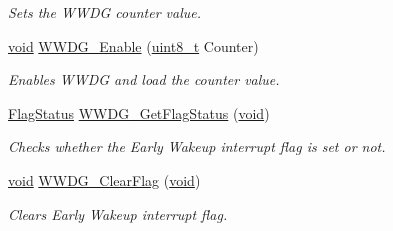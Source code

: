 \begin{DoxyCompactItemize}
\begin{DoxyCompactList}\small\item\em Sets the W\+W\+DG counter value. \end{DoxyCompactList}\item 
\hyperlink{usb__devapi_8h_afabf60e7f57651d6d595a02c75f07cd0}{void} \hyperlink{group___w_w_d_g___private___functions_ga10dc2554d0b504b5472e3ecf0f02a9e6}{W\+W\+D\+G\+\_\+\+Enable} (\hyperlink{_p_e___types_8h_aba7bc1797add20fe3efdf37ced1182c5}{uint8\+\_\+t} Counter)
\begin{DoxyCompactList}\small\item\em Enables W\+W\+DG and load the counter value. \end{DoxyCompactList}\item 
\hyperlink{agilefox_2library_2inc_2stm32f10x__type_8h_a89136caac2e14c55151f527ac02daaff}{Flag\+Status} \hyperlink{group___w_w_d_g___private___functions_ga7df4882d45918b9b8249dfca1e44fabc}{W\+W\+D\+G\+\_\+\+Get\+Flag\+Status} (\hyperlink{usb__devapi_8h_afabf60e7f57651d6d595a02c75f07cd0}{void})
\begin{DoxyCompactList}\small\item\em Checks whether the Early Wakeup interrupt flag is set or not. \end{DoxyCompactList}\item 
\hyperlink{usb__devapi_8h_afabf60e7f57651d6d595a02c75f07cd0}{void} \hyperlink{group___w_w_d_g___private___functions_gabd2b5a6317c2e1a3ab0795838ce59dd2}{W\+W\+D\+G\+\_\+\+Clear\+Flag} (\hyperlink{usb__devapi_8h_afabf60e7f57651d6d595a02c75f07cd0}{void})
\begin{DoxyCompactList}\small\item\em Clears Early Wakeup interrupt flag. \end{DoxyCompactList}\end{DoxyCompactItemize}
